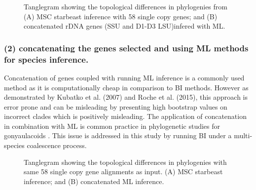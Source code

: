 \documentclass[12pt]{article}
\begin{document}
\FloatBarrier 
\begin{figure} 
\caption{Tanglegram showing the topological differences in phylogenies from (A) MSC starbeast inference with 58 single copy genes; and (B) concatenated rDNA genes (SSU and D1-D3 LSU)infered with ML.} 
\label{fig:tanglerdna}
\end{figure} 
\FloatBarrier

\subsubsection*{(2) concatenating the genes selected and using ML methods for species inference.}
Concatenation of genes coupled with running ML inference is a commonly used method as it is computationally cheap in comparison to BI methods. 
However as demonstrated by Kubatko et al. (2007) and Roche et al. (2015), this approach is error prone and can be misleading by presenting high bootstrap values on incorrect clades which is positively misleading.
The application of concatenation in combination with ML is common practice in phylogenetic studies for gonyaulacoids  \cite{shalchian2006combined,zhang2007three,saldarriaga2004molecular,murray2005improving,hoppenrath2010dinoflagellate}.
This issue is addressed in this study by running BI under a multi-species coalescence process.
\FloatBarrier 
\begin{figure} 
\caption{Tanglegram showing the topological differences in phylogenies with same 58 single copy gene alignments as input. (A) MSC starbeast inference; and (B) concatenated ML inference.} 
\label{fig:tangleconcat}
\end{figure} 
\FloatBarrier
\end{document}
